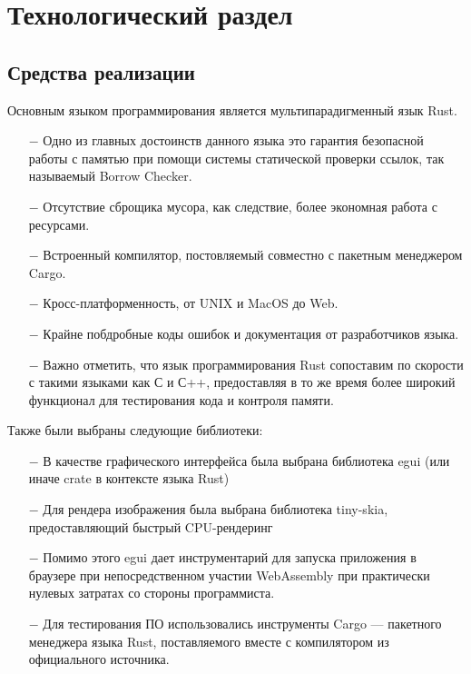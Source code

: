 \section{Технологический раздел}

\subsection{Средства реализации}

Основным языком программирования является мультипарадигменный язык Rust\cite{rust}.
\begin{itemize}
    \item[$-$] Одно из главных достоинств данного языка это гарантия безопасной работы с памятью при помощи системы
    статической проверки ссылок, так называемый Borrow Checker\cite{borrow-checker}.
    \item[$-$] Отсутствие сброщика мусора, как следствие, более экономная работа с ресурсами.
    \item[$-$] Встроенный компилятор, постовляемый совместно с пакетным менеджером Cargo.
    \item[$-$] Кросс-платформенность, от UNIX и MacOS до Web.
    \item[$-$] Крайне побдробные коды ошибок и документация от разработчиков языка.
    \item[$-$] Важно отметить, что язык программирования Rust сопоставим по скорости с такими языками как С и С++,
    предоставляя в то же время более широкий функционал для тестирования кода и контроля памяти.
\end{itemize}

Также были выбраны следующие библиотеки:
\begin{itemize}
    \item[$-$] В качестве графического интерфейса была выбрана библиотека egui\cite{egui} (или иначе crate в контексте языка Rust)
    \item[$-$] Для рендера изображения была выбрана библиотека tiny-skia\cite{tiny-skia}, предоставляющий быстрый CPU-рендеринг
    \item[$-$] Помимо этого egui дает инструментарий для запуска приложения в браузере при непосредственном участии WebAssembly при практически нулевых затратах со стороны программиста.
    \item[$-$] Для тестирования ПО использовались инструменты Cargo\cite{cargo} --- пакетного менеджера языка Rust, поставляемого вместе с компилятором из официального источника.
\end{itemize}

